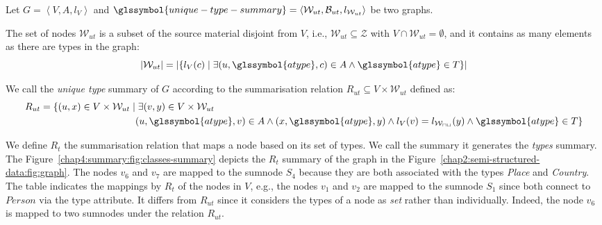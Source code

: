 \begin{definition}
Let $G=\left\langle V, A, l_V \right\rangle$ and $\glssymbol{unique-type-summary} = \left\langle \mathcal{W}_{ut}, \mathcal{B}_{ut}, l_{\mathcal{W}_{ut}} \right\rangle$ be two graphs.

The set of nodes $\mathcal{W}_{ut}$ is a subset of the source material disjoint from $V$, i.e., $\mathcal{W}_{ut} \subseteq \mathcal{Z}$ with $V \cap \mathcal{W}_{ut} = \emptyset$, and it contains as many elements as there are \gls{types} in the graph:
$$
\lvert \mathcal{W}_{ut} \rvert = \lvert \left\lbrace l_V(c) \mid \exists (u, \glssymbol{atype}, c) \in A \wedge \glssymbol{atype} \in T \right\rbrace \rvert
$$

We call  the \emph{unique type} summary of $G$ according to the summarisation relation $R_{ut} \subseteq V \times \mathcal{W}_{ut}$ defined as:
$$
\begin{aligned}
R_{ut} = \{ (u, x) \in V \times \mathcal{W}_{ut} \mid &\; \exists (v, y) \in V \times \mathcal{W}_{ut} \\
	& (u,\glssymbol{atype},v) \in A \wedge (x,\glssymbol{atype},y) \wedge l_V(v) = l_\mathcal{W_{ut}}(y) \wedge \glssymbol{atype} \in T \}
\end{aligned}
$$
\label{chap4:summary:def:unique-type}
\end{definition}
\vspace{.5cm}


We define $R_t$ the summarisation relation that maps a node based on its set of \gls{types}. We call the summary it generates the \emph{types} summary.
The Figure~\ref{chap4:summary:fig:classes-summary} depicts the $R_t$ summary of the graph in the Figure~\ref{chap2:semi-structured-data:fig:graph}. The nodes $v_6$ and $v_7$ are mapped to the sumnode $S_4$ because they are both associated with the types \emph{Place} and \emph{Country}. The table indicates the mappings by $R_t$ of the nodes in $V$, e.g., the nodes $v_1$ and $v_2$ are mapped to the sumnode $S_1$ since both connect to $Person$ via the type attribute. It differs from $R_{ut}$ since it considers the types of a node as \emph{set} rather than individually. Indeed, the node $v_6$ is mapped to two sumnodes under the relation $R_{ut}$.

